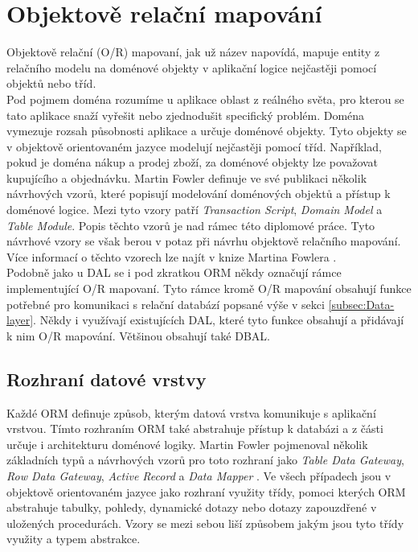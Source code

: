 \documentclass[ing,male,java,dept456]{diploma}						%
\begin{document}

\section{Objektově relační mapování}

Objektově relační (O/R) mapovaní, jak už název napovídá, mapuje entity z relačního modelu na doménové objekty v aplikační logice nejčastěji pomocí objektů nebo tříd. \\
Pod pojmem doména rozumíme u aplikace oblast z reálného světa, pro kterou se tato aplikace snaží vyřešit nebo zjednodušit specifický problém. Doména vymezuje rozsah působnosti aplikace a určuje doménové objekty. Tyto objekty se v objektově orientovaném jazyce modelují nejčastěji pomocí tříd. Například, pokud je doména nákup a prodej zboží, za doménové objekty lze považovat kupujícího a objednávku. Martin Fowler definuje ve své publikaci několik návrhových vzorů, které popisují modelování doménových objektů a přístup k doménové logice. Mezi tyto vzory patří \textit{Transaction Script}, \textit{Domain Model} a \textit{Table Module}. Popis těchto vzorů je nad rámec této diplomové práce. Tyto návrhové vzory se však berou v potaz při návrhu objektově relačního mapování. Více informací o těchto vzorech lze najít v knize Martina Fowlera \cite{fowler}.\\
Podobně jako u DAL se i pod zkratkou ORM někdy označují rámce implementující O/R mapovaní. Tyto rámce kromě O/R mapování obsahují funkce potřebné pro komunikaci s relační databází popsané výše v sekci \ref{subsec:Data-layer}. Někdy i využívají existujících DAL, které tyto funkce obsahují a přidávají k nim O/R mapování. Většinou obsahují také DBAL. \\

\subsection{Rozhraní datové vrstvy}

Každé ORM definuje způsob, kterým datová vrstva komunikuje s aplikační vrstvou. Tímto rozhraním ORM také abstrahuje přístup k databázi a z části určuje i architekturu doménové logiky. Martin Fowler pojmenoval několik základních typů a návrhových vzorů pro toto rozhraní jako \textit{Table Data Gateway}, \textit{Row Data Gateway}, \textit{Active Record} a \textit{Data Mapper} \cite{fowler}. Ve všech případech jsou v objektově orientovaném jazyce jako rozhraní využity třídy, pomoci kterých ORM abstrahuje tabulky, pohledy, dynamické 	dotazy nebo dotazy zapouzdřené v uložených procedurách. Vzory se mezi sebou liší způsobem jakým jsou tyto třídy využity a typem abstrakce.
\end{document}
